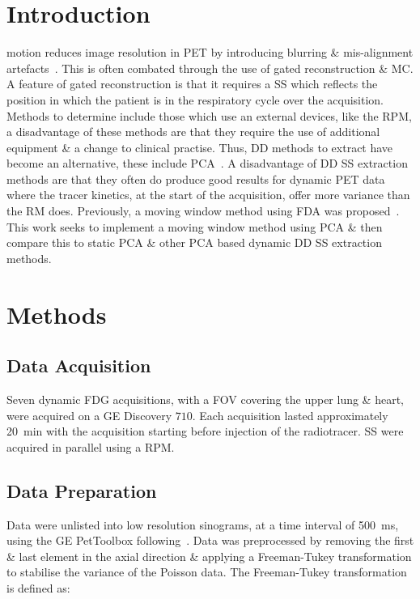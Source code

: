 \section{Introduction} \label{sec:introduction}
     motion reduces image resolution in \gls{PET} by introducing blurring \& mis-alignment artefacts~\cite{Nehmeh2008a}. This is often combated through the use of gated reconstruction \& \gls{MC}. A feature of gated reconstruction is that it requires a \gls{SS} which reflects the position in which the patient is in the respiratory cycle over the acquisition. Methods to determine  include those which use an external devices, like the \gls{RPM}, a disadvantage of these methods are that they require the use of additional equipment \& a change to clinical practise. Thus, \gls{DD} methods to extract  have become an alternative, these include \gls{PCA}~\cite{Thielemans2011}. A disadvantage of \gls{DD} \gls{SS} extraction methods are that they often do produce good results for dynamic \gls{PET} data where the tracer kinetics, at the start of the acquisition, offer more variance than the \gls{RM} does. Previously, a moving window method using \gls{FDA} was proposed~\cite{Schleyer2014}. This work seeks to implement a moving window method using \gls{PCA} \& then compare this to static \gls{PCA} \& other \gls{PCA} based dynamic \gls{DD} \gls{SS} extraction methods.

\section{Methods} \label{sec:methods}
\subsection{Data Acquisition} \label{sec:data_acquisition}
        Seven dynamic \gls{FDG} acquisitions, with a \gls{FOV} covering the upper lung \& heart, were acquired on a \gls{GE} Discovery $710$. Each acquisition lasted approximately \SI{20}{\minute} with the acquisition starting before injection of the radiotracer. \gls{SS} were acquired in parallel using a \gls{RPM}.
        
    \subsection{Data Preparation} \label{sec:data_preparation}
        Data were unlisted into low resolution sinograms, at a time interval of \SI{500}{\milli\second}, using the \gls{GE} PetToolbox following~\cite{Bertolli2018Data-DrivenTomography}. Data was preprocessed by removing the first \& last element in the axial direction \& applying a Freeman-Tukey transformation to stabilise the variance of the Poisson data. The Freeman-Tukey transformation is defined as:
        
